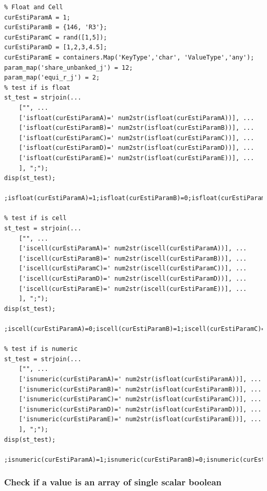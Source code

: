 \documentclass[
]{book}
\begin{document}
\begin{verbatim}
% Float and Cell
curEstiParamA = 1;
curEstiParamB = {146, 'R3'};
curEstiParamC = rand([1,5]);
curEstiParamD = [1,2,3,4.5];
curEstiParamE = containers.Map('KeyType','char', 'ValueType','any');
param_map('share_unbanked_j') = 12;
param_map('equi_r_j') = 2;
% test if is float
st_test = strjoin(...
    ["", ...
    ['isfloat(curEstiParamA)=' num2str(isfloat(curEstiParamA))], ...
    ['isfloat(curEstiParamB)=' num2str(isfloat(curEstiParamB))], ...
    ['isfloat(curEstiParamC)=' num2str(isfloat(curEstiParamC))], ...
    ['isfloat(curEstiParamD)=' num2str(isfloat(curEstiParamD))], ...
    ['isfloat(curEstiParamE)=' num2str(isfloat(curEstiParamE))], ...
    ], ";");
disp(st_test);

;isfloat(curEstiParamA)=1;isfloat(curEstiParamB)=0;isfloat(curEstiParamC)=1;isfloat(curEstiParamD)=1;isfloat(curEstiParamE)=0

% test if is cell
st_test = strjoin(...
    ["", ...
    ['iscell(curEstiParamA)=' num2str(iscell(curEstiParamA))], ...
    ['iscell(curEstiParamB)=' num2str(iscell(curEstiParamB))], ...
    ['iscell(curEstiParamC)=' num2str(iscell(curEstiParamC))], ...
    ['iscell(curEstiParamD)=' num2str(iscell(curEstiParamD))], ...
    ['iscell(curEstiParamE)=' num2str(iscell(curEstiParamE))], ...
    ], ";");
disp(st_test);

;iscell(curEstiParamA)=0;iscell(curEstiParamB)=1;iscell(curEstiParamC)=0;iscell(curEstiParamD)=0;iscell(curEstiParamE)=0

% test if is numeric
st_test = strjoin(...
    ["", ...
    ['isnumeric(curEstiParamA)=' num2str(isfloat(curEstiParamA))], ...
    ['isnumeric(curEstiParamB)=' num2str(isfloat(curEstiParamB))], ...
    ['isnumeric(curEstiParamC)=' num2str(isfloat(curEstiParamC))], ...
    ['isnumeric(curEstiParamD)=' num2str(isfloat(curEstiParamD))], ...
    ['isnumeric(curEstiParamE)=' num2str(isfloat(curEstiParamE))], ...
    ], ";");
disp(st_test);

;isnumeric(curEstiParamA)=1;isnumeric(curEstiParamB)=0;isnumeric(curEstiParamC)=1;isnumeric(curEstiParamD)=1;isnumeric(curEstiParamE)=0
\end{verbatim}

\hypertarget{check-if-a-value-is-an-array-of-single-scalar-boolean}{%
\subsubsection{Check if a value is an array of single scalar boolean}\label{check-if-a-value-is-an-array-of-single-scalar-boolean}}
\end{document}
